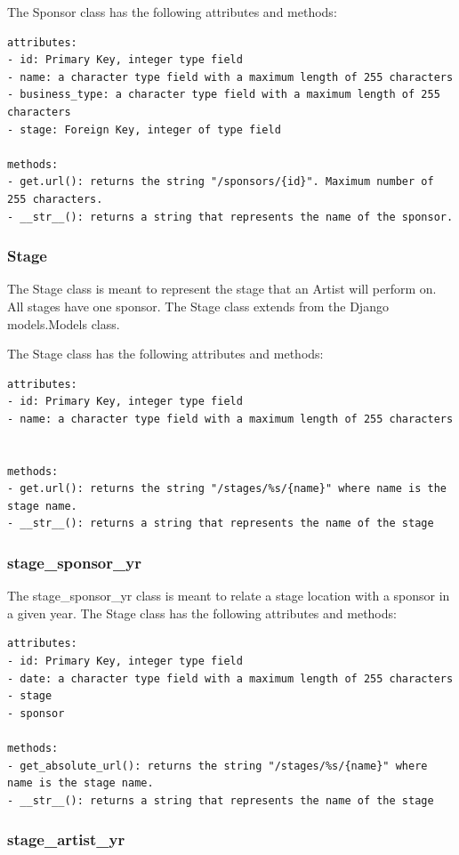 \documentclass[12pt,english]{scrartcl}
\begin{document}
The Sponsor class has the following attributes and methods:
\begin{verbatim}
attributes:
- id: Primary Key, integer type field
- name: a character type field with a maximum length of 255 characters
- business_type: a character type field with a maximum length of 255 characters
- stage: Foreign Key, integer of type field

methods:
- get.url(): returns the string "/sponsors/{id}". Maximum number of 255 characters.
- __str__(): returns a string that represents the name of the sponsor.
\end{verbatim}

\subsubsection{Stage}

The Stage class is meant to represent the stage that an Artist will perform on. All stages
have one sponsor. The Stage class extends from the Django models.Models class.

The Stage class has the following attributes and methods:
\begin{verbatim}
attributes:
- id: Primary Key, integer type field
- name: a character type field with a maximum length of 255 characters


methods:
- get.url(): returns the string "/stages/%s/{name}" where name is the stage name.
- __str__(): returns a string that represents the name of the stage
\end{verbatim}

\subsubsection{stage\_sponsor\_yr}

The stage\_sponsor\_yr class is meant to relate a stage location with a sponsor in a given year.
The Stage class has the following attributes and methods:
\begin{verbatim}
attributes:
- id: Primary Key, integer type field
- date: a character type field with a maximum length of 255 characters
- stage
- sponsor

methods:
- get_absolute_url(): returns the string "/stages/%s/{name}" where name is the stage name.
- __str__(): returns a string that represents the name of the stage
\end{verbatim}

\subsubsection{stage\_artist\_yr}
\end{document}
